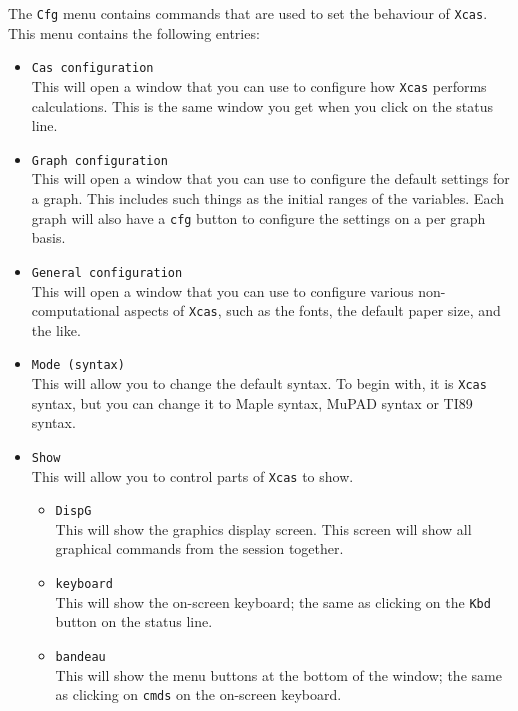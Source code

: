 \documentclass[a4paper,11pt]{book}
\begin{document}
The \texttt{Cfg} menu contains commands that are used to set the
behaviour of \texttt{Xcas}.  This menu contains the following entries:
\begin{itemize}
  \item \texttt{Cas configuration}\\
  This will open a window that you can use to configure how
  \texttt{Xcas} performs calculations.  This is the same window you
  get when you click on the status line.
  
  \item \texttt{Graph configuration}\\
  This will open a window that you can use to configure the default
  settings for a graph.  This includes such things as the initial
  ranges of the variables.  Each graph will also have a \texttt{cfg}
  button  to configure the settings on a per graph basis.
  
  \item \texttt{General configuration}\\
  This will open a window that you can use to configure various 
  non-computational aspects of \texttt{Xcas}, such as the fonts, the
  default paper size, and the like.
  
  \item \texttt{Mode (syntax)}\\
  This will allow you to change the default syntax.  To begin with, it
  is \texttt{Xcas} syntax, but you can change it to Maple syntax,
  MuPAD syntax or TI89 syntax.
  
  \item \texttt{Show}\\
  This will allow you to control parts of \texttt{Xcas} to show.
  \begin{itemize}
    \item   \texttt{DispG}\\
    This will show the graphics display screen.
    This screen will show all graphical commands from the session
    together.  

    \item \texttt{keyboard}\\
    This will show the on-screen keyboard; the same as clicking on the
    \texttt{Kbd} button on the status line.

    \item \texttt{bandeau}\\
    This will show the menu buttons at the bottom of the window;
    the same as clicking on \texttt{cmds} on the on-screen keyboard.
    

\end{itemize}
\end{itemize}
\end{document}
